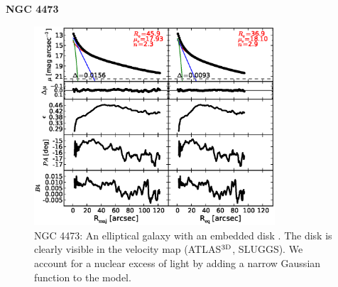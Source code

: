 \documentclass[preprint2]{emulateapj}
\newcommand{\fitfigurewidth}{0.8\textwidth}
\begin{document}
  \clearpage\newpage\noindent
  {\bf NGC 4473 \\}

  \begin{figure}[h]
  \begin{center}
  \includegraphics[width=\fitfigurewidth]{images/n4473_1Dfit.eps}
  \caption{NGC 4473: 
  An elliptical galaxy with an embedded disk \citep{ledo2010}.
  The disk is clearly visible in the velocity map (ATLAS$^{\rm 3D}$, SLUGGS). 
  We account for a nuclear excess of light by adding a narrow Gaussian function to the model.
  }
  \end{center}
  \end{figure}
  
\end{document}
